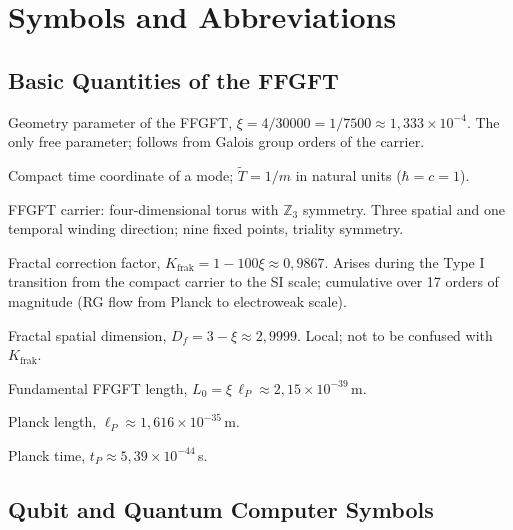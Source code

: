 \chapter*{Symbols and Abbreviations}

\section*{Basic Quantities of the FFGFT}

\begin{description}[leftmargin=4.5em,style=sameline,itemsep=0.4em]
  \item[$\xi$] Geometry parameter of the FFGFT, $\xi = 4/30000 =
    1/7500 \approx 1{,}333\times10^{-4}$. The only free parameter;
    follows from Galois group orders of the carrier.
  \item[$\tilde T$] Compact time coordinate of a mode; $\tilde T =
    1/m$ in natural units ($\hbar = c = 1$).
  \item[$T^4/\mathbb{Z}_3$] FFGFT carrier: four-dimensional torus with
    $\mathbb{Z}_3$ symmetry. Three spatial and one temporal
    winding direction; nine fixed points, triality symmetry.
  \item[$K_{\mathrm{frak}}$] Fractal correction factor,
    $K_{\mathrm{frak}} = 1 - 100\xi \approx 0{,}9867$. Arises during the
    Type I transition from the compact carrier to the SI scale; cumulative over
    17 orders of magnitude (RG flow from Planck to electroweak scale).
  \item[$D_f$] Fractal spatial dimension, $D_f = 3 - \xi \approx
    2{,}9999$. Local; not to be confused with $K_{\mathrm{frak}}$.
  \item[$L_0$] Fundamental FFGFT length, $L_0 = \xi\,\ell_P \approx
    2{,}15\times10^{-39}$\,m.
  \item[$\ell_P$] Planck length, $\ell_P \approx 1{,}616\times10^{-35}$\,m.
  \item[$t_P$] Planck time, $t_P \approx 5{,}39\times10^{-44}$\,s.
\end{description}

\section*{Qubit and Quantum Computer Symbols}

